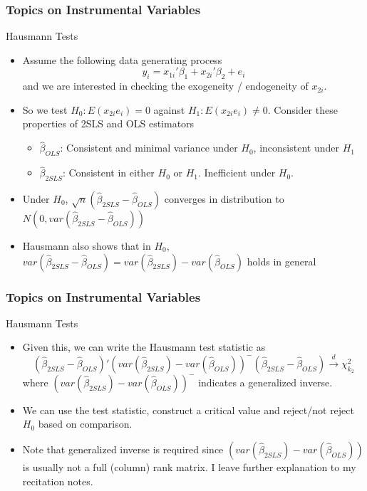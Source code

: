 \documentclass{beamer}
\begin{document}
\begin{frame}
\frametitle{Topics on Instrumental Variables}
Hausmann Tests
\begin{itemize}
\item Assume the following data generating process
\[
y_i = x_{1i}'\beta_1 + x_{2i}'\beta_2+e_i
\]
and we are interested in checking the exogeneity / endogeneity of $x_{2i}$. 
\item So we test $H_0: E(x_{2i}e_i)=0$ against $H_1:E(x_{2i}e_i)\neq0$. Consider these properties of 2SLS and OLS estimators
\begin{itemize}
\item $\hat{\beta}_{OLS}$: Consistent and minimal variance under $H_0$, inconsistent under $H_1$
\item $\hat{\beta}_{2SLS}$:  Consistent in either $H_0$ or $H_1$. Inefficient under $H_0$. 
\end{itemize}
\item Under $H_0$, $\sqrt{n}(\hat{\beta}_{2SLS}-\hat{\beta}_{OLS})$ converges in distribution to $N(0, var(\hat{\beta}_{2SLS}-\hat{\beta}_{OLS}))$
\item Hausmann also shows that in $H_0$, $var(\hat{\beta}_{2SLS}-\hat{\beta}_{OLS})=var(\hat{\beta}_{2SLS})-var(\hat{\beta}_{OLS})$ holds in general
\end{itemize}
\end{frame}

\begin{frame}
\frametitle{Topics on Instrumental Variables}
Hausmann Tests
\begin{itemize}
\item Given this, we can write the Hausmann test statistic as 
\[
(\hat{\beta}_{2SLS}-\hat{\beta}_{OLS})'(var(\hat{\beta}_{2SLS})-var(\hat{\beta}_{OLS}))^-(\hat{\beta}_{2SLS}-\hat{\beta}_{OLS})\xrightarrow{d}\chi_{k_2}^2
\]
where $(var(\hat{\beta}_{2SLS})-var(\hat{\beta}_{OLS}))^-$ indicates a generalized inverse.
\item We can use the test statistic, construct a critical value and reject/not reject $H_0$ based on comparison.
\item Note that generalized inverse is required since $(var(\hat{\beta}_{2SLS})-var(\hat{\beta}_{OLS}))$ is usually not a full (column) rank matrix. I leave further explanation to my recitation notes.
\end{itemize}
\end{frame}
\end{document}
